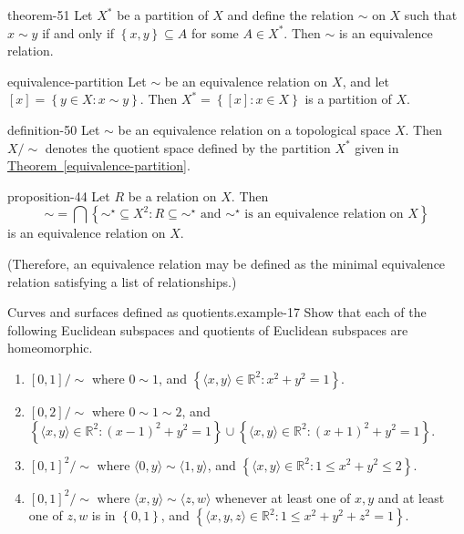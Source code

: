 \documentclass[10pt,]{article}
\newcommand{\tuple}[1]{\langle #1 \rangle}
\newcommand{\mb}{\mathbb}
\newcommand{\setBuilder}[2]{\left\{#1:#2\right\}}
\newcommand{\setList}[1]{\left\{#1\right\}}
\begin{document}
\begin{theorem}{}{}{theorem-51}%
\hypertarget{p-195}{}%
Let \(X^*\) be a partition of \(X\) and define the relation \(\sim\) on \(X\) such that \(x\sim y\) if and only if \(\setList{x,y}\subseteq A\) for some \(A\in X^*\). Then \(\sim\) is an equivalence relation.%
\end{theorem}
\begin{theorem}{}{}{equivalence-partition}%
\hypertarget{p-196}{}%
Let \(\sim\) be an equivalence relation on \(X\), and let \([x]=\setBuilder{y\in X}{x\sim y}\). Then \(X^*=\setBuilder{[x]}{x\in X}\) is a partition of \(X\).%
\end{theorem}
\begin{definition}{}{definition-50}%
\hypertarget{p-197}{}%
Let \(\sim\) be an equivalence relation on a topological space \(X\). Then \(X/\sim\) denotes the quotient space defined by the partition \(X^*\) given in \hyperref[equivalence-partition]{Theorem~\ref{equivalence-partition}}.%
\end{definition}
\begin{proposition}{}{}{proposition-44}%
\hypertarget{p-198}{}%
Let \(R\) be a relation on \(X\). Then%
\begin{equation*}
\sim=\bigcap\setBuilder{\sim^\star\subseteq X^2}{R\subseteq\sim^\star\text{ and }\sim^\star
\text{ is an equivalence relation on }X}
\end{equation*}
is an equivalence relation on \(X\).%
\par
\hypertarget{p-199}{}%
(Therefore, an equivalence relation may be defined as the minimal equivalence relation satisfying a list of relationships.)%
\end{proposition}
\begin{example}{Curves and surfaces defined as quotients.}{example-17}%
\hypertarget{p-200}{}%
Show that each of the following Euclidean subspaces and quotients of Euclidean subspaces are homeomorphic.%
\leavevmode%
\begin{enumerate}
\item\hypertarget{li-119}{}\([0,1]/\sim\) where \(0\sim 1\), and \(\setBuilder{\tuple{x,y}\in\mb R^2}{x^2+y^2=1}\).%
\item\hypertarget{li-120}{}\([0,2]/\sim\) where \(0\sim 1\sim 2\), and \(\setBuilder{\tuple{x,y}\in\mb R^2}{(x-1)^2+y^2=1}\cup\setBuilder{\tuple{x,y}\in\mb R^2}{(x+1)^2+y^2=1}\).%
\item\hypertarget{li-121}{}\([0,1]^2/\sim\) where \(\tuple{0,y}\sim\tuple{1,y}\), and \(\setBuilder{\tuple{x,y}\in\mb R^2}{1\leq x^2+y^2\leq 2}\).%
\item\hypertarget{li-122}{}\([0,1]^2/\sim\) where \(\tuple{x,y}\sim\tuple{z,w}\) whenever at least one of \(x,y\) and at least one of \(z,w\) is in \(\setList{0,1}\), and \(\setBuilder{\tuple{x,y,z}\in\mb R^2}{1\leq x^2+y^2+z^2=1}\).%
\end{enumerate}
\end{example}
\end{document}
